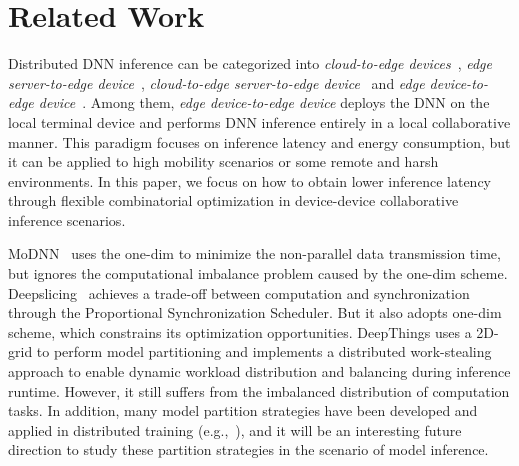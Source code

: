 \section{Related Work}
\label{sec-related}
 Distributed DNN inference can be categorized into \emph{cloud-to-edge devices}~\cite{song2018situ,jeong2018ionn}, \emph{edge server-to-edge device}~\cite{mohammed2020distributed,shan2020collaborative}, \emph{cloud-to-edge server-to-edge device}~\cite{ren2021fine,xue2021eosdnn,lin2019distributed,dey2019offloaded} and \emph{edge device-to-edge device}~\cite{zhao2018deepthings,zhang2021deepslicing,mao2017modnn,zhou2019adaptive}. Among them, \emph{edge device-to-edge device} deploys the DNN on the local terminal device and performs DNN inference entirely in a local collaborative manner. This paradigm focuses on inference latency and energy consumption, but it can be applied to high mobility scenarios or some remote and harsh environments. In this paper, we focus on how to obtain lower inference latency through flexible combinatorial optimization in device-device collaborative inference scenarios.

MoDNN~\cite{mao2017modnn} uses the one-dim to minimize the non-parallel data transmission time, but ignores the computational imbalance problem caused by the one-dim scheme. 
Deepslicing~\cite{zhang2021deepslicing} achieves a trade-off between computation and synchronization through the Proportional Synchronization Scheduler. But it also adopts one-dim scheme, which constrains its optimization opportunities. 
DeepThings\cite{zhao2018deepthings} uses a 2D-grid to perform model partitioning and implements a distributed work-stealing approach to enable dynamic workload distribution and balancing during inference runtime. However, it still suffers from the imbalanced distribution of computation tasks. In addition, many model partition strategies have been developed and applied in distributed training (e.g.,~\cite{vldb14-flexps,icde20-fela,elasticpipe}), and it will be an interesting future direction to study these partition strategies in the scenario of model inference. 

